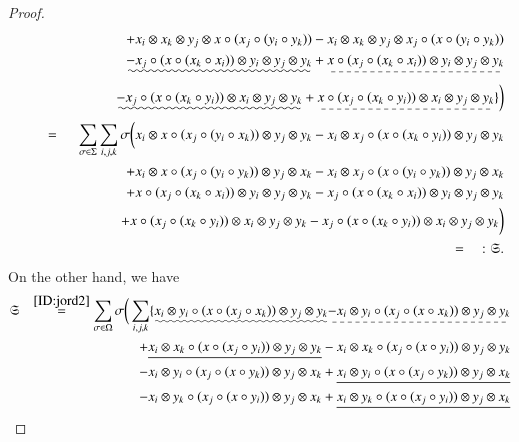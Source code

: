\documentclass[12pt, reqno, a4paper]{amsart}
\theoremstyle{definition}
\begin{document}
\begin{proof}
\begin{eqnarray*}
		&&\quad\quad + x_i \otimes x_k \otimes y_j \otimes x \circ (x_j \circ (y_i \circ y_k)) - x_i \otimes x_k \otimes y_j \otimes x_j \circ (x \circ (y_i \circ y_k)) \\
		&&\quad\quad \uwave{ - x_j \circ (x \circ (x_k \circ x_i)) \otimes y_i \otimes y_j \otimes y_k} + \dashuline{ x \circ (x_j \circ (x_k \circ x_i)) \otimes y_i \otimes y_j \otimes y_k} \\
		&&\quad\quad \uwave{ - x_j \circ (x \circ (x_k \circ y_i)) \otimes x_i \otimes y_j \otimes y_k} + \dashuline{ x \circ (x_j \circ (x_k \circ y_i)) \otimes x_i \otimes y_j \otimes y_k} \} \bigg) \\
		&&\overset{\hphantom{\eqref{eq:pr1}}}{=} \sum_{\sigma \in \Sigma} \sum_{i,j, k} \sigma\bigg( x_i \otimes x \circ (x_j \circ (y_i \circ x_k)) \otimes y_j \otimes y_k- x_i\otimes x_j \circ (x \circ (x_k \circ y_i)) \otimes y_j \otimes y_k\\
		&&\quad\quad + x_i \otimes x \circ (x_j \circ (y_i \circ y_k)) \otimes y_j \otimes x_k - x_i \otimes x_j \circ (x \circ (y_i \circ y_k)) \otimes y_j \otimes x_k \\
		&&\quad\quad + x \circ (x_j \circ (x_k \circ x_i)) \otimes y_i \otimes y_j \otimes y_k - x_j \circ (x \circ (x_k \circ x_i)) \otimes y_i \otimes y_j \otimes y_k \\
		&&\quad\quad + x \circ (x_j \circ (x_k \circ y_i)) \otimes x_i \otimes y_j \otimes y_k - x_j \circ (x \circ (x_k \circ y_i)) \otimes x_i \otimes y_j \otimes y_k \bigg) \\
		&&\overset{\hphantom{\eqref{eq:pr1}}}{=} : \mathfrak{S}.
	\end{eqnarray*}
	On the other hand, we have
	\begin{eqnarray*}
		&\mathfrak{S}&\overset{\eqref{ID:jord2}}{=}\sum_{\sigma \in \Omega}\sigma\bigg( \sum_{i,j, k} \{ \uwave{ x_i \otimes y_i \circ (x \circ (x_j \circ x_k)) \otimes y_j \otimes y_k} \dashuline{ - x_i \otimes y_i \circ (x_j \circ (x \circ x_k)) \otimes y_j \otimes y_k} \\
		&&\quad\quad + \uline{ x_i \otimes x_k \circ (x \circ (x_j \circ y_i)) \otimes y_j \otimes y_k} - x_i \otimes x_k \circ (x_j \circ (x \circ y_i)) \otimes y_j \otimes y_k \\
		&&\quad\quad - x_i \otimes y_i \circ (x_j \circ (x \circ y_k)) \otimes y_j \otimes x_k + \uline{ x_i \otimes y_i \circ (x \circ (x_j \circ y_k)) \otimes y_j \otimes x_k} \\
		&&\quad\quad - x_i \otimes y_k \circ (x_j \circ (x \circ y_i)) \otimes y_j \otimes x_k + \uline{ x_i \otimes y_k \circ (x \circ (x_j \circ y_i)) \otimes y_j \otimes x_k} \\

\end{eqnarray*}
\end{proof}
\end{document}
